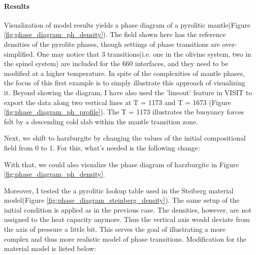\paragraph{Results}

\par Visualization of model results yields a phase diagram of a pyrolitic mantle(Figure \ref{fig:phase_diagram_ph_density}). %
The field shown here has the reference densities of the pyrolite phases, though settings of phase transitions are over-simplified.
One may notice that 3 transitions(i.e. one in the olivine system, two in the spinel system) are included for the 660 interfaces, %
and they need to be modified at a higher temperature.
In spite of the complexities of mantle phases, the focus of this first example is to simply illustrate this approach of visualizing it.
Beyond showing the diagram, I have also used the 'lineout' feature in VISIT to export the data along two vertical lines at T = 1173 and T = 1673 (Figure \ref{fig:phase_diagram_ph_profile}). %
The T = 1173 illustrates the buoyancy forces felt by a descending cold slab within the mantle transition zone.

\par Next, we shift to harzburgite by changing the values of the initial compositional field from 0 to 1.  %
For this, what's needed is the following change:

With that, we could also visualize the phase diagram of harzburgite in Figure \ref{fig:phase_diagram_ph_density}.

\par Moreover, I tested the a pyrolitic lookup table used in the Steiberg material model(Figure \ref{fig:phase_diagram_steinberg_density}).%
The same setup of the initial condition is applied as in the previous case. %
The densities, however, are not assigned to the heat capacity anymore.
Thus the vertical axis would deviate from the axis of pressure a little bit.
This serves the goal of illustrating a more complex and thus more realistic model of phase transitions.
Modification for the material model is listed below:


